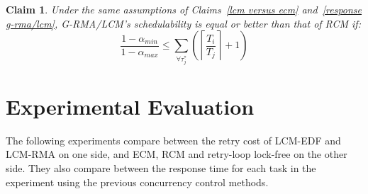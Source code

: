\documentclass[conference]{sig-alternate}
\newtheorem{clm}{Claim}
\begin{document}
\begin{clm}\label{rma_eval_clm}
Under the same assumptions of Claims~\ref{lcm versus ecm} and~\ref{response g-rma/lcm}, G-RMA/LCM's schedulability is equal or better than that of RCM if:
\begin{equation}
\frac{1-\alpha_{min}}{1-\alpha_{max}}\le \sum_{\forall \tau_j^*}\left( \left\lceil\frac{T_i}{T_j}\right\rceil +1 \right)
\label{eq70}\end{equation}
\end{clm}
%

\section{Experimental Evaluation}\label{exp_eval}
The following experiments compare between the retry cost of LCM-EDF and LCM-RMA on one side, and ECM, RCM and retry-loop lock-free on the other side. They also compare between the response time for each task in the experiment using the previous concurrency control methods.
\end{document}
